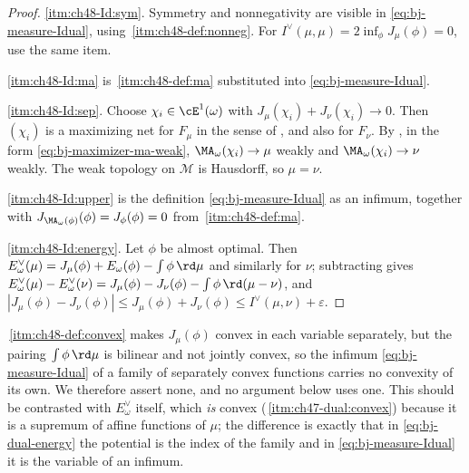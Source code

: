 \begin{proof}
\cref{itm:ch48-Id:sym}.  Symmetry and nonnegativity are visible in
\eqref{eq:bj-measure-Idual}, using
\,\cref{itm:ch48-def:nonneg}.  For
$I^\vee(\mu,\mu)=2\inf_\phi J_\mu(\phi)=0$, use the same item.

\cref{itm:ch48-Id:ma} is
\,\cref{itm:ch48-def:ma} substituted into
\eqref{eq:bj-measure-Idual}.

\cref{itm:ch48-Id:sep}.  Choose $\chi_i\in\cE^1(\omega)$ with
$J_\mu(\chi_i)+J_\nu(\chi_i)\to0$.  Then $(\chi_i)$ is a maximizing net
for $F_\mu$ in the sense of , and also for
$F_\nu$.  By , in the form
\eqref{eq:bj-maximizer-ma-weak}, $\MA_\omega(\chi_i)\to\mu$ weakly and
$\MA_\omega(\chi_i)\to\nu$ weakly.  The weak topology on $\mathcal M$
is Hausdorff, so $\mu=\nu$.

\cref{itm:ch48-Id:upper} is the definition
\eqref{eq:bj-measure-Idual} as an infimum, together with
$J_{\MA_\omega(\phi)}(\phi)=J_\phi(\phi)=0$ from
\,\cref{itm:ch48-def:ma}.

\cref{itm:ch48-Id:energy}.  Let $\phi$ be almost optimal.  Then
$E^\vee_\omega(\mu)=J_\mu(\phi)+E_\omega(\phi)-\int\phi\,\rd\mu$ and
similarly for $\nu$; subtracting gives
$E^\vee_\omega(\mu)-E^\vee_\omega(\nu)
=J_\mu(\phi)-J_\nu(\phi)-\int\phi\,\rd(\mu-\nu)$, and
$|J_\mu(\phi)-J_\nu(\phi)|\le J_\mu(\phi)+J_\nu(\phi)
\le I^\vee(\mu,\nu)+\varepsilon$.
\end{proof}

\begin{remark}
\label{rem:ch48-Idual-not-convex}
\,\cref{itm:ch48-def:convex} makes
$J_\mu(\phi)$ convex in each variable separately, but the pairing
$\int\phi\,\rd\mu$ is bilinear and not jointly convex, so the infimum
\eqref{eq:bj-measure-Idual} of a family of separately convex functions
carries no convexity of its own.  We therefore assert none, and no argument
below uses one.  This should be contrasted with $E^\vee_\omega$ itself,
which \emph{is} convex
(\,\cref{itm:ch47-dual:convex}) because it
is a supremum of affine functions of $\mu$; the difference is exactly
that in \eqref{eq:bj-dual-energy} the potential is the index of the family
and in \eqref{eq:bj-measure-Idual} it is the variable of an infimum.
\end{remark}

